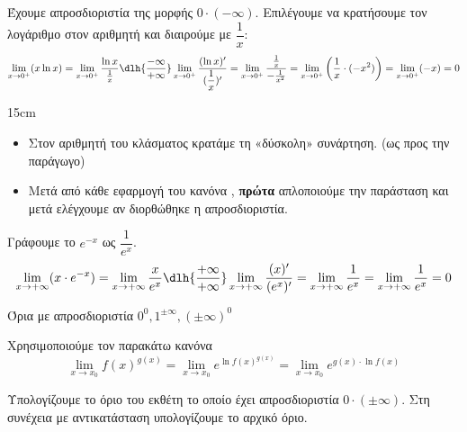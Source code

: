 \lysh\vspace{-7mm}
\begin{alist}
\item Έχουμε απροσδιοριστία της μορφής $0 \cdot (-\infty)$. Επιλέγουμε να κρατήσουμε τον λογάριθμο στον αριθμητή και διαιρούμε με $\dfrac{1}{x}$:
\[ \lim\limits_{x\to 0^+} (x \ln x) = \lim\limits_{x\to 0^+} \dfrac{\ln x}{\frac{1}{x}} \dlh{\frac{-\infty}{+\infty}} \lim\limits_{x\to 0^+} \dfrac{(\ln x)'}{(\dfrac{1}{x})'} = \lim\limits_{x\to 0^+} \dfrac{\frac{1}{x}}{-\frac{1}{x^2}} = \lim\limits_{x\to 0^+} \left( \dfrac{1}{x} \cdot (-x^2) \right) = \lim\limits_{x\to 0^+} (-x) = {0} \]
\begin{center}
\begin{parat}{15cm}
\begin{itemize}[leftmargin=2mm]
\item Στον αριθμητή του κλάσματος κρατάμε τη «δύσκολη» συνάρτηση. (ως προς την παράγωγο)
\item Μετά από κάθε εφαρμογή του κανόνα , \textbf{πρώτα} απλοποιούμε την παράσταση και μετά ελέγχουμε αν διορθώθηκε η απροσδιοριστία.
\end{itemize}
\end{parat}
\end{center}
\item 
Γράφουμε το $e^{-x}$ ως $\dfrac{1}{e^x}$.
\[ \lim\limits_{x\to +\infty} (x \cdot e^{-x}) = \lim\limits_{x\to +\infty} \dfrac{x}{e^x} \dlh{\frac{+\infty}{+\infty}} \lim\limits_{x\to +\infty} \dfrac{(x)'}{(e^x)'} = \lim\limits_{x\to +\infty} \dfrac{1}{e^x} = \lim\limits_{x\to +\infty} \dfrac{1}{e^x} = {0} \]
\end{alist}
\begin{askhsh}{Όρια με απροσδιοριστία $ 0^0,1^{\pm\infty},(\pm\infty)^0 $}
\bhmata\begin{bhma}
\item Χρησιμοποιούμε τον παρακάτω κανόνα
\[ \lim\limits_{x\to x_0}{f(x)^{g(x)}}=\lim\limits_{x\to x_0}{e^{\ln{f(x)^{g(x)}}}}=\lim\limits_{x\to x_0}{e^{g(x)\cdot\ln{f(x)}}} \]
\item Υπολογίζουμε το όριο του εκθέτη το οποίο έχει απροσδιοριστία $ 0\cdot(\pm\infty) $. Στη συνέχεια με αντικατάσταση υπολογίζουμε το αρχικό όριο.
\end{bhma}
\end{askhsh}
